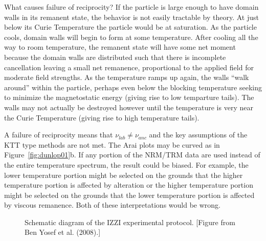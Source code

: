 What causes failure of reciprocity?   
If the particle is large enough to have domain walls in its remanent state,   the behavior is  not easily tractable by theory.  At just below its Curie Temperature  the particle would be at saturation.    As the particle cools,  domain walls will begin to form at some temperature.  After cooling all the way to room temperature, the  remanent state will have some net moment because the domain walls are distributed such that there is incomplete cancellation leaving a small net remanence, proportional to the applied field for moderate field strengths.  As the temperature ramps up again, the walls  ``walk around'' within the particle, perhaps even below the blocking temperature seeking to minimize the magnetostatic energy (giving rise to low temparture tails).  The walls may  not actually be destroyed however until the  temperature is very near the Curie Temperature (giving rise to high temperature tails).  


A failure of reciprocity means that $\nu_{lab} \neq \nu_{anc}$ and the key assumptions of the KTT type methods are not met.  The  Arai plots  may be curved as in Figure~\ref{fig:dunlop01}b.   If any portion of the NRM/TRM data are used  instead of the entire temperature spectrum, the result could be biased.  For example,  the lower temperature portion might be selected on the grounds that the higher temperature portion is affected by alteration or the higher temperature portion might be selected on the grounds that the lower temperature portion is affected by viscous remanence.  Both of these interpretations would be wrong.   

\begin{figure}[h!tb]
\epsfxsize 14.5cm
\centering {}
\caption{Schematic diagram of the  IZZI experimental protocol.  [Figure from Ben Yosef et al. (2008).]    }
\label{fig:method}
\end{figure}
  \nocite{benyosef08}


